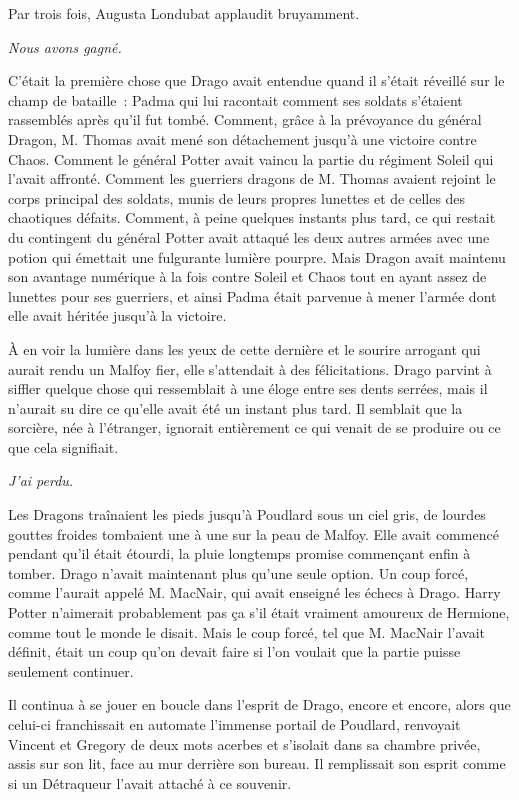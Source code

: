 Par trois fois, Augusta Londubat applaudit bruyamment.

\later

\emph{Nous avons gagné.}

C'était la première chose que Drago avait entendue quand il s'était réveillé sur le champ de bataille~: Padma qui lui racontait comment ses soldats s'étaient rassemblés après qu'il fut tombé. Comment, grâce à la prévoyance du général Dragon, M. Thomas avait mené son détachement jusqu'à une victoire contre Chaos. Comment le général Potter avait vaincu la partie du régiment Soleil qui l'avait affronté. Comment les guerriers dragons de M. Thomas avaient rejoint le corps principal des soldats, munis de leurs propres lunettes et de celles des chaotiques défaits. Comment, à peine quelques instants plus tard, ce qui restait du contingent du général Potter avait attaqué les deux autres armées avec une potion qui émettait une fulgurante lumière pourpre. Mais Dragon avait maintenu son avantage numérique à la fois contre Soleil et Chaos tout en ayant assez de lunettes pour ses guerriers, et ainsi Padma était parvenue à mener l'armée dont elle avait héritée jusqu'à la victoire.

À en voir la lumière dans les yeux de cette dernière et le sourire arrogant qui aurait rendu un Malfoy fier, elle s'attendait à des félicitations. Drago parvint à siffler quelque chose qui ressemblait à une éloge entre ses dents serrées, mais il n'aurait su dire ce qu'elle avait été un instant plus tard. Il semblait que la sorcière, née à l'étranger, ignorait entièrement ce qui venait de se produire ou ce que cela signifiait.

\emph{J'ai perdu.}

Les Dragons traînaient les pieds jusqu'à Poudlard sous un ciel gris, de lourdes gouttes froides tombaient une à une sur la peau de Malfoy. Elle avait commencé pendant qu'il était étourdi, la pluie longtemps promise commençant enfin à tomber. Drago n'avait maintenant plus qu'une seule option. Un coup forcé, comme l'aurait appelé M. MacNair, qui avait enseigné les échecs à Drago. Harry Potter n'aimerait probablement pas ça s'il était vraiment amoureux de Hermione, comme tout le monde le disait. Mais le coup forcé, tel que M. MacNair l'avait définit, était un coup qu'on devait faire si l'on voulait que la partie puisse seulement continuer.

Il continua à se jouer en boucle dans l'esprit de Drago, encore et encore, alors que celui-ci franchissait en automate l'immense portail de Poudlard, renvoyait Vincent et Gregory de deux mots acerbes et s'isolait dans sa chambre privée, assis sur son lit, face au mur derrière son bureau. Il remplissait son esprit comme si un Détraqueur l'avait attaché à ce souvenir.

